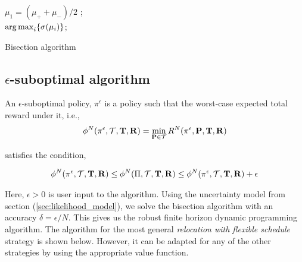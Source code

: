 \begin{algorithm}
\LinesNumbered
$\mu_1 = (\mu_{+} + \mu_{-})/2$ ;\\
\Return $\operatorname*{arg\,max}_i \{\sigma(\mu_i)\}$;
\caption{Bisection algorithm}
\label{alg:bisection_algorithm}
\end{algorithm}


\subsection{\texorpdfstring{$\epsilon$}{epsilon}-suboptimal algorithm}

An $\epsilon$-suboptimal policy, $\pi^\epsilon$ is a policy such that the worst-case expected total reward under it, i.e., 
\begin{eqnarray*}
\phi^N(\pi^\epsilon, \mathcal{T}, \mathbf{T}, \mathbf{R}) = \min_{\mathbf{P} \in \mathcal{T}} R^N(\pi^\epsilon, \mathbf{P}, \mathbf{T}, \mathbf{R})
\end{eqnarray*}

satisfies the condition,

\begin{eqnarray}
\phi^N(\pi^\epsilon, \mathcal{T}, \mathbf{T}, \mathbf{R}) \leq \phi^N(\Pi, \mathcal{T}, \mathbf{T}, \mathbf{R}) \leq \phi^N(\pi^\epsilon, \mathcal{T}, \mathbf{T}, \mathbf{R}) + \epsilon
\end{eqnarray}

Here, $\epsilon > 0$ is user input to the algorithm. Using the uncertainty model from section (\ref{sec:likelihood_model}), we solve the bisection algorithm with an accuracy $\delta = \epsilon / N$. This gives us the robust finite horizon dynamic programming algorithm. The algorithm for the most general \textit{relocation with flexible schedule} strategy is shown below. However, it can be adapted for any of the other strategies by using the appropriate value function.

